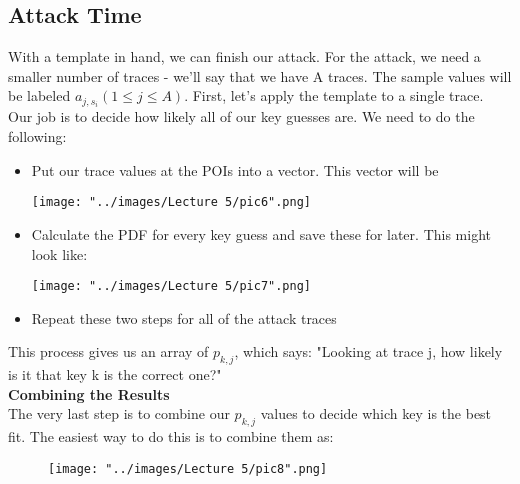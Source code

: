 \documentclass{report}
\begin{document}
    \subsection{Attack Time}
    With a template in hand, we can finish our attack. For the attack, we need a smaller number of traces - we'll say that we have A traces. The sample values will be labeled $a_{j, s_i} (1 \le j \le A)$.
    First, let's apply the template to a single trace. Our job is to decide how likely all of our key guesses are. We need to do the following:
    \begin{itemize}
      \item Put our trace values at the POIs into a vector. This vector will be
       \begin{minipage}{\linewidth}
      \centering
      \texttt{[image: "../images/Lecture 5/pic6".png]}
      \end{minipage}
       
      \item Calculate the PDF for every key guess and save these for later. This might look like:
      \begin{minipage}{\linewidth}
      \centering
      \texttt{[image: "../images/Lecture 5/pic7".png]}
      \end{minipage}
      \item Repeat these two steps for all of the attack traces
    \end{itemize}
    This process gives us an array of $p_{k, j}$, which says: "Looking at trace j, how likely is it that key k is the correct one?"\\
    \textbf{Combining the Results}\\
    The very last step is to combine our $p_{k, j}$ values to decide which key is the best fit. The easiest way to do this is to combine them as:
    
    \begin{figure}[htp]
        \centering
        \texttt{[image: "../images/Lecture 5/pic8".png]}
       \end{figure}
    
\end{document}
